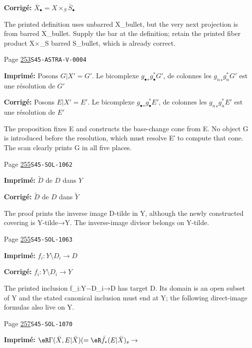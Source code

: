 \begin{description}
\par\noindent\textbf{Corrigé:} \(\bar X_\bullet=X\times_S \bar S_\bullet\)
\par\noindent The printed definition uses unbarred X\_bullet, but the very next projection is from barred X\_bullet. Supply the bar at the definition; retain the printed fiber product X×\_S barred S\_bullet, which is already correct.
\smallskip
\item[\hypertarget{apparatus:FR-0263}{263}] Page \hyperlink{printpage:fr:253}{253}\quad\texttt{S45-ASTRA-V-0004}
\par\noindent\textbf{Imprimé:} Posons $G|X'=G'$. Le bicomplexe 
${g_\bullet}_\ast g_\bullet^\ast G'$, de colonnes les 
${g_n}_\ast g_n^\ast G'$ est une résolution de $G'$
\par\noindent\textbf{Corrigé:} Posons $E|X'=E'$. Le bicomplexe 
${g_\bullet}_\ast g_\bullet^\ast E'$, de colonnes les 
${g_n}_\ast g_n^\ast E'$ est une résolution de $E'$
\par\noindent The proposition fixes E and constructs the base-change cone from E. No object G is introduced before the resolution, which must resolve E′ to compute that cone. The scan clearly prints G in all five places.
\smallskip
\item[\hypertarget{apparatus:FR-0264}{264}] Page \hyperlink{printpage:fr:255}{255}\quad\texttt{S45-SOL-1062}
\par\noindent\textbf{Imprimé:} $\widetilde D$ de $D$ dans $Y$
\par\noindent\textbf{Corrigé:} $\widetilde D$ de $D$ dans $\widetilde Y$
\par\noindent The proof prints the inverse image D-tilde in Y, although the newly constructed covering is Y-tilde→Y. The inverse-image divisor belongs on Y-tilde.
\smallskip
\item[\hypertarget{apparatus:FR-0265}{265}] Page \hyperlink{printpage:fr:255}{255}\quad\texttt{S45-SOL-1063}
\par\noindent\textbf{Imprimé:} \(f_i:Y\setminus D_i \to D\)
\par\noindent\textbf{Corrigé:} \(f_i:Y\setminus D_i \to Y\)
\par\noindent The printed inclusion f\_i:Y−D\_i→D has target D. Its domain is an open subset of Y and the stated canonical inclusion must end at Y; the following direct-image formulas also live on Y.
\smallskip
\item[\hypertarget{apparatus:FR-0266}{266}] Page \hyperlink{printpage:fr:257}{257}\quad\texttt{S45-SOL-1070}
\par\noindent\textbf{Imprimé:} \(\eR\Gamma(\bar X,E|\bar X) (=\eR\bar f_\ast (E|\bar X)_s \to\)

\end{description}

